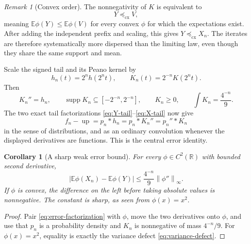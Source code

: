 \documentclass[11pt,oneside]{article}
\newtheorem{corollary}[theorem]{Corollary}
\theoremstyle{definition}
\theoremstyle{remark}
\newtheorem{remark}[theorem]{Remark}
\newcommand{\R}{\mathbb R}
\newcommand{\Up}{\operatorname{up}}
\newcommand{\E}{\mathbb E}
\newcommand{\supp}{\operatorname{supp}}
\newcommand{\norm}[1]{\left\lVert #1\right\rVert}
\begin{document}
\begin{remark}[Convex order]
The nonnegativity of $K$ is equivalent to
\begin{equation}
 Y\preceq_{\mathrm{cx}}V,                                  \label{eq:convex-order}
\end{equation}
meaning $\E\phi(Y)\le\E\phi(V)$ for every convex $\phi$ for which the expectations exist.
After adding the independent prefix and scaling, this gives
$Y\preceq_{\mathrm{cx}}X_n$.  The iterates are therefore systematically more dispersed than
the limiting law, even though they share the same support and mean.
\end{remark}

Scale the signed tail and its Peano kernel by
\begin{equation}
 h_n(t)=2^nh(2^nt),
 \qquad
 K_n(t)=2^{-n}K(2^nt).                                     \label{eq:scaled-K}
\end{equation}
Then
\begin{equation}
 K_n''=h_n,
 \qquad
 \supp K_n\subseteq[-2^{-n},2^{-n}],
 \qquad
 K_n\ge0,
 \qquad
 \int K_n=\frac{4^{-n}}9.                                 \label{eq:scaled-K-properties}
\end{equation}
The two exact tail factorizations \eqref{eq:Y-tail}--\eqref{eq:X-tail} now give
\begin{equation}
 f_n-\Up=p_n*h_n=p_n*K_n''=p_n''*K_n                       \label{eq:error-factorization}
\end{equation}
in the sense of distributions, and as an ordinary convolution whenever the displayed
derivatives are functions.  This is the central error identity.

\begin{corollary}[A sharp weak error bound]
\label{cor:weak-error}
For every $\phi\in C^2(\R)$ with bounded second derivative,
\begin{equation}
 \left|\E\phi(X_n)-\E\phi(Y)\right|
 \le\frac{4^{-n}}9\norm{\phi''}_\infty.                   \label{eq:weak-error}
\end{equation}
If $\phi$ is convex, the difference on the left before taking absolute values is nonnegative.
The constant is sharp, as seen from $\phi(x)=x^2$.
\end{corollary}

\begin{proof}
Pair \eqref{eq:error-factorization} with $\phi$, move the two derivatives onto $\phi$, and use
that $p_n$ is a probability density and $K_n$ is nonnegative of mass $4^{-n}/9$.
For $\phi(x)=x^2$, equality is exactly the variance defect \eqref{eq:variance-defect}.
\end{proof}
\end{document}
